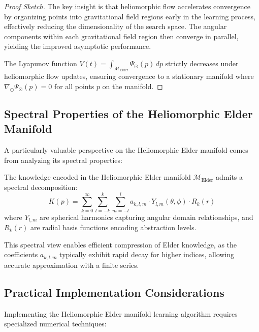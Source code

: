 \begin{proof}[Proof Sketch]
The key insight is that heliomorphic flow accelerates convergence by organizing points into gravitational field regions early in the learning process, effectively reducing the dimensionality of the search space. The angular components within each gravitational field region then converge in parallel, yielding the improved asymptotic performance.

The Lyapunov function $V(t) = \int_{\mathcal{M}_{\text{Elder}}} \Psi_{\odot}(p) \, dp$ strictly decreases under heliomorphic flow updates, ensuring convergence to a stationary manifold where $\nabla_{\odot} \Psi_{\odot}(p) = 0$ for all points $p$ on the manifold.
\end{proof}

\subsection{Spectral Properties of the Heliomorphic Elder Manifold}

A particularly valuable perspective on the Heliomorphic Elder manifold comes from analyzing its spectral properties:

\begin{proposition}
The knowledge encoded in the Heliomorphic Elder manifold $\mathcal{M}_{\text{Elder}}$ admits a spectral decomposition:
\begin{equation}
K(p) = \sum_{k=0}^{\infty} \sum_{l=-k}^k \sum_{m=-l}^l a_{k,l,m} \cdot Y_{l,m}(\theta, \phi) \cdot R_k(r)
\end{equation}
where $Y_{l,m}$ are spherical harmonics capturing angular domain relationships, and $R_k(r)$ are radial basis functions encoding abstraction levels.
\end{proposition}

This spectral view enables efficient compression of Elder knowledge, as the coefficients $a_{k,l,m}$ typically exhibit rapid decay for higher indices, allowing accurate approximation with a finite series.

\subsection{Practical Implementation Considerations}

Implementing the Heliomorphic Elder manifold learning algorithm requires specialized numerical techniques:

